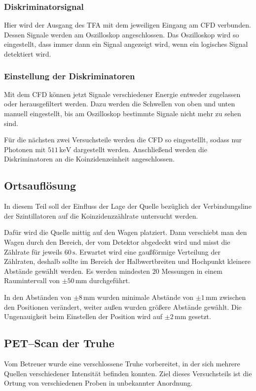 \documentclass[12pt,a4paper]{scrartcl}
\numberwithin{equation}{section} %
\newcommand{\pu}[1]{\ensuremath{\mathrm{#1}}}
\begin{document}
\subsubsection{Diskriminatorsignal}
Hier wird der Ausgang des TFA mit dem jeweiligen Eingang am CFD verbunden. Dessen Signale werden am Oszilloskop angeschlossen. Das Oszilloskop wird so eingestellt, dass immer dann ein Signal angezeigt wird, wenn ein logisches Signal detektiert wird.

\subsubsection{Einstellung der Diskriminatoren}
Mit dem CFD können jetzt Signale verschiedener Energie entweder zugelassen oder herausgefiltert werden. Dazu werden die Schwellen von oben und unten manuell eingestellt, bis am Oszilloskop bestimmte Signale nicht mehr zu sehen sind.

Für die nächsten zwei Versuchsteile werden die CFD so eingestelllt, sodass nur Photonen mit $\pu{511\, keV}$ dargestellt werden. Anschließend werden die Diskriminatoren an die Koinzidenzeinheit angeschlossen.

\subsection{Ortsauflösung}
\label{sec:Ortsauflösung}
In diesem Teil soll der Einfluss der Lage der Quelle bezüglich der Verbindungsline der Szintillatoren auf die Koinzidenzzählrate untersucht werden.

Dafür wird die Quelle mittig auf den Wagen platziert. Dann verschiebt man den Wagen durch den Bereich, der vom Detektor abgedeckt wird und misst die Zählrate für jeweils $60\,\mathrm{s}$. Erwartet wird eine gaußförmige Verteilung der Zählraten, deshalb sollte im Bereich der Halbwertbreiten und Hochpunkt kleinere Abstände gewählt werden. Es werden mindesten $20$ Messungen in einem Raumintervall von $\pm 50\,\mathrm{mm}$ durchgeführt.

In den Abständen von $\pm 8\,\mathrm{mm}$ wurden minimale Abstände von $\pm 1\,\mathrm{mm}$ zwischen den Positionen verändert, weiter außen wurden größere Abstände gewählt. Die Ungenauigkeit beim Einstellen der Position wird auf $\pu{\pm 2\, mm}$ gesetzt.

\subsection{PET--Scan der Truhe}
Vom Betreuer wurde eine verschlossene Truhe vorbereitet, in der sich mehrere Quellen verschiedener Intensität befinden konnten.  Ziel dieses Versuchsteils ist die Ortung von verschiedenen Proben in unbekannter Anordnung.
\end{document}
